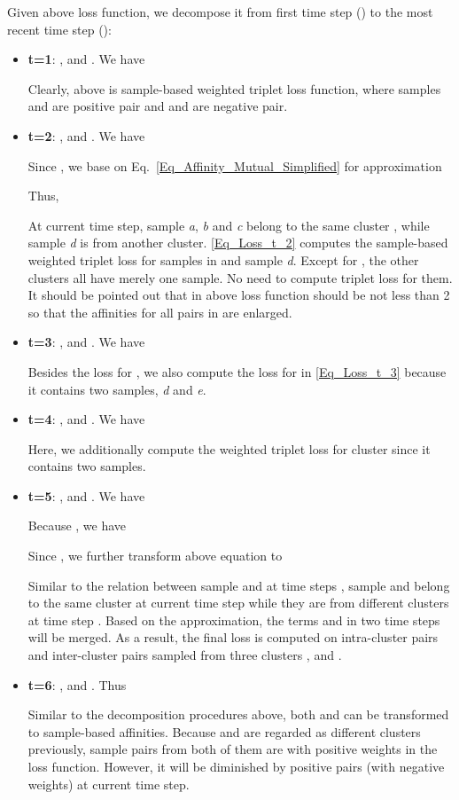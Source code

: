 \documentclass[10pt,twocolumn,letterpaper]{article}
\begin{document}
Given above loss function, we decompose it from first time step () to the most recent time step ():
\begin{itemize}
\item \textbf{t=1}: ,  and . We have


Clearly, above is sample-based weighted triplet loss function, where samples  and  are positive pair and  and  are negative pair.

\item \textbf{t=2}: ,  and . We have


Since , we base on Eq.~\eqref{Eq_Affinity_Mutual_Simplified} for approximation



Thus, 


At current time step, sample \textit{a}, \textit{b} and \textit{c} belong to the same cluster , while sample \textit{d} is from another cluster. \eqref{Eq_Loss_t_2} computes the sample-based weighted triplet loss for samples in  and sample \textit{d}. Except for , the other clusters all have merely one sample. No need to compute triplet loss for them. It should be pointed out that  in above loss function should be not less than 2 so that the affinities for all pairs in  are enlarged.

\item \textbf{t=3}: ,  and . We have


Besides the loss  for , we also compute the loss for  in \eqref{Eq_Loss_t_3} because it contains two samples, \textit{d} and \textit{e}.

\item \textbf{t=4}: ,  and . We have


Here, we additionally compute the weighted triplet loss for cluster  since it contains two samples.

\item \textbf{t=5}: ,  and . We have


Because , we have



Since , we further transform above equation to


Similar to the relation between sample  and  at time steps , sample  and  belong to the same cluster  at current time step while they are from different clusters at time step . Based on the approximation, the terms  and  in two time steps will be merged. As a result, the final loss is computed on intra-cluster pairs and inter-cluster pairs sampled from three clusters ,  and . 

\item \textbf{t=6}: ,  and . Thus


Similar to the decomposition procedures above, both  and  can be transformed to sample-based affinities. Because  and  are regarded as different clusters previously, sample pairs from both of them are with positive weights in the loss function. However, it will be diminished by positive pairs (with negative weights) at current time step. 
\end{itemize}
\end{document}
